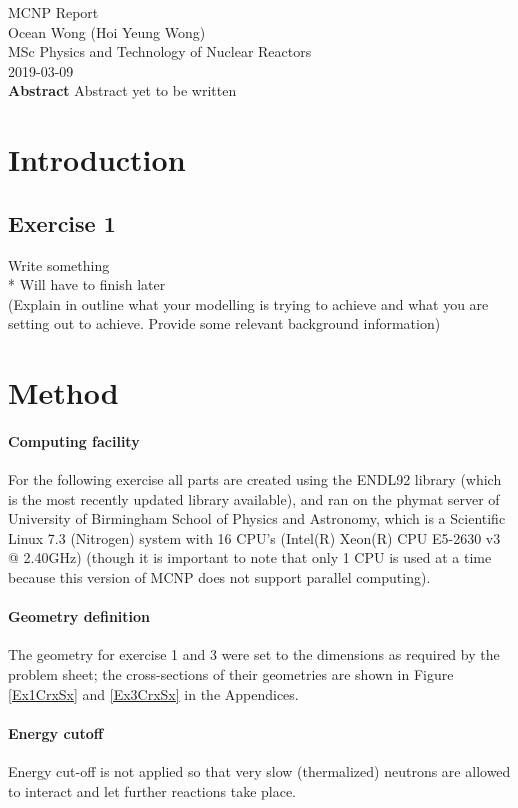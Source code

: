 \documentclass[a4paper, 12pt]{article}
\begin{document}
\begin{center}
MCNP Report										\\
Ocean Wong (Hoi Yeung Wong)						\\
MSc Physics and Technology of Nuclear Reactors	\\
2019-03-09 										\\
\textbf{Abstract}
Abstract yet to be written
\end{center}

\section{Introduction}
\subsection{Exercise 1}
Write something
\\* Will have to finish later
\\(Explain in outline what your modelling is trying to achieve and what you are setting out to achieve. Provide some relevant background information)

\section{Method}
\paragraph{Computing facility}For the following exercise all parts are created using the ENDL92 library (which is the most recently updated library available), and ran on the phymat server of University of Birmingham School of Physics and Astronomy, which is a Scientific Linux 7.3 (Nitrogen) system with 16 CPU's (Intel(R) Xeon(R) CPU E5-2630 v3 @ 2.40GHz) (though it is important to note that only 1 CPU is used at a time because this version of MCNP does not support parallel computing). 
\paragraph{Geometry definition} The geometry for exercise 1 and 3 were set to the dimensions as required by the problem sheet; the cross-sections of their geometries are shown in Figure \ref{Ex1CrxSx} and \ref{Ex3CrxSx} in the Appendices.
\paragraph{Energy cutoff}
Energy cut-off is not applied so that very slow (thermalized) neutrons are allowed to interact and let further reactions take place.
\end{document}
